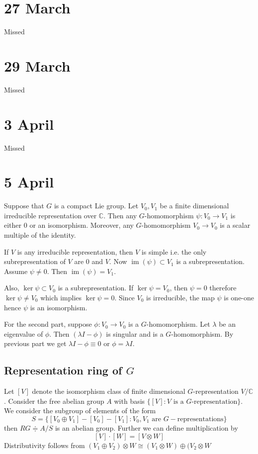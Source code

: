 \documentclass[11pt,a4paper]{scrarticle}
\theoremstyle{definition}
\renewenvironment{proof}[1][\proofname]{\vspace{-10pt}\begin{myproof}}{\end{myproof}}
\theoremstyle{greenbox}
\newcommand{\C}{\mathbb{C}}
\newcommand{\define}{\doteqdot}
\begin{document}
\section{27 March}
Missed  
\section{29 March}
Missed
\section{3 April}
Missed
\section{5 April}

\begin{lemma}
    Suppose that $ G $ is a compact Lie group. Let $ V_{0}, V_{1} $ be a finite dimensional irreducible representation over $\C $. Then any $ G $-homomorphism $ \psi : V_{0} \to V_{1} $ is either $ 0 $ or an isomorphism. Moreover, any $ G $-homomorphism $ V_{0} \to V_{0} $ is a scalar multiple of the identity.
\end{lemma}
\begin{proof}
    If $ V $ is any irreducible representation, then $ V $ is simple i.e. the only subrepresentation of $ V $ are $ 0 $ and $ V $. Now $ \operatorname{im}(\psi) \subset V_{1}$ is a subrepresentation. Assume $ \psi \neq 0 $. Then $ \operatorname{im}(\psi) = V_{1} $. 

    Also, $ \ker \psi \subset V_{0} $ is a subrepresentation. If $ \ker \psi = V_{0} $, then $ \psi = 0 $ therefore $ \ker \psi \neq V_{0} $ which implies $ \ker \psi = 0 $. Since $ V_{0} $ is irreducible, the map $ \psi $ is one-one hence $ \psi  $ is an isomorphism. 

    For the second part, suppose $ \phi : V_{0} \to V_{0} $ is a $ G $-homomorphism. Let $ \lambda $ be an eigenvalue of $ \phi $. Then $ (\lambda I - \phi) $ is singular and is a $ G $-homomorphism. By previous part we get $ \lambda I - \phi \equiv 0 $ or $ \phi = \lambda I $.
\end{proof}

\subsection*{Representation ring of $ G $}

Let $ [V] $ denote the isomorphism class of finite dimensional $ G $-representation $ V / \C $. Consider the free abelian group $ A $ with basis $ \{[V] : V \text{ is a }G\text{-representation}\} $. We consider the subgroup of elements of the form 
\[ S = \{[V_{0} \oplus V_{1}] - [V_{0}]- [V_{1}]  : V_{0}, V_{1} \text{ are } G-\text{representations}\} \]
then $ RG \define A / S $ is an abelian group. Further we can define multiplication by 
\[ [V] \cdot [W] = [V \otimes W] \]
Distributivity follows from $ (V_{1} \oplus V_{2}) \otimes W \cong (V_{1} \otimes W) \oplus (V_{2} \otimes W $
\end{document}
